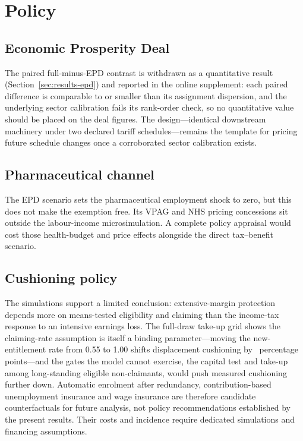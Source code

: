 \section{Policy}\label{sec:policy}

\subsection{Economic Prosperity Deal}\label{sec:policy-epd}

The paired full-minus-EPD contrast is withdrawn as a quantitative result (Section~\ref{sec:results-epd}) and reported in the online supplement: each paired difference is comparable to or smaller than its assignment dispersion, and the underlying sector calibration fails its rank-order check, so no quantitative value should be placed on the deal figures. The design---identical downstream machinery under two declared tariff schedules---remains the template for pricing future schedule changes once a corroborated sector calibration exists.

\subsection{Pharmaceutical channel}\label{sec:policy-pharma}

The EPD scenario sets the pharmaceutical employment shock to zero, but this does not make the exemption free. Its VPAG and NHS pricing concessions sit outside the labour-income microsimulation. A complete policy appraisal would cost those health-budget and price effects alongside the direct tax--benefit scenario.

\subsection{Cushioning policy}\label{sec:policy-reforms}

The simulations support a limited conclusion: extensive-margin protection depends more on means-tested eligibility and claiming than the income-tax response to an intensive earnings loss. The full-draw take-up grid shows the claiming-rate assumption is itself a binding parameter---moving the new-entitlement rate from 0.55 to 1.00 shifts displacement cushioning by \TakeupConventionSpread\ percentage points---and the gates the model cannot exercise, the capital test and take-up among long-standing eligible non-claimants, would push measured cushioning further down. Automatic enrolment after redundancy, contribution-based unemployment insurance and wage insurance are therefore candidate counterfactuals for future analysis, not policy recommendations established by the present results. Their costs and incidence require dedicated simulations and financing assumptions.

